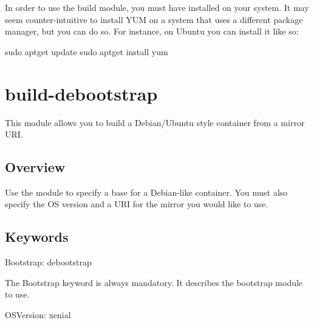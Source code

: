 \documentclass[letterpaper,10pt,english]{sphinxmanual}
\begin{document}
In order to use the  build module, you must have  installed on your system. It may seem counter-intuitive to install YUM on a system
that uses a different package manager, but you can do so. For instance, on Ubuntu you can install it like so:

%
\begin{sphinxVerbatim}[commandchars=\\\{\}]
\PYGZdl{} sudo apt\PYGZhy{}get update \PYGZam{}\PYGZam{} sudo apt\PYGZhy{}get install yum
\end{sphinxVerbatim}


\section{build-debootstrap}
\label{\detokenize{appendix:build-debootstrap}}\label{\detokenize{appendix:id14}}\label{\detokenize{appendix:sec-build-debootstrap}}
This module allows you to build a Debian/Ubuntu style container from a mirror URI.


\subsection{Overview}
\label{\detokenize{appendix:id15}}
Use the  module to specify a base for a Debian-like container. You must also specify the OS version and a URI for the mirror you would like to use.


\subsection{Keywords}
\label{\detokenize{appendix:id16}}
%
\begin{sphinxVerbatim}[commandchars=\\\{\}]
Bootstrap: debootstrap
\end{sphinxVerbatim}

The Bootstrap keyword is always mandatory. It describes the bootstrap module to use.

%
\begin{sphinxVerbatim}[commandchars=\\\{\}]
OSVersion: xenial
\end{sphinxVerbatim}
\end{document}

